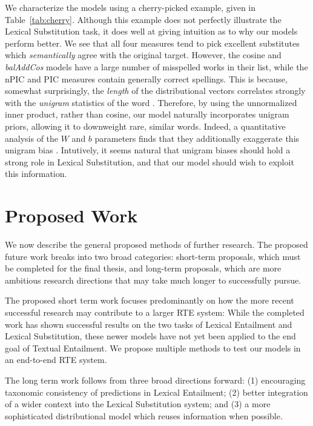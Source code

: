 \documentclass[12pt]{article}
\begin{document}
We characterize the models using a cherry-picked example,
given in Table~\ref{tab:cherry}. Although this example does not perfectly illustrate
the Lexical Substitution task, it does well at giving intuition as to why our
models perform better. We see that all four measures
tend to pick excellent substitutes which {\em semantically} agree with the
original target. However, the cosine and {\em balAddCos} models have a large number of
misspelled works in their list, while the nPIC and PIC measures contain
generally correct spellings. This is because, somewhat surprisingly, the {\em
length} of the distributional vectors correlates strongly with the {\em
unigram} statistics of the word \cite{wilson:2015:arxiv}.
Therefore, by using the unnormalized inner
product, rather than cosine, our model naturally incorporates unigram priors,
allowing it to downweight rare, similar words. Indeed, a quantitative analysis
of the $W$ and $b$ parameters finds that they additionally exaggerate this
unigram bias \cite{roller:2016:naacl}.
Intutively, it seems natural that unigram biases should hold a strong role in
Lexical Substitution, and that our model should wish to exploit this
information.

\section{Proposed Work}

We now describe the general proposed methods of further research. The proposed
future work breaks into two broad categories: short-term proposals,
which must be completed for the final thesis, and long-term proposals, which
are more ambitious research directions that may take much longer to successfully
pursue.

The proposed short term work focuses predominantly on how the more recent
successful research may contribute to a larger RTE system: While the completed
work has shown successful results on the two tasks of Lexical Entailment and
Lexical Substitution, these newer models have not yet been applied to the end
goal of Textual Entailment. We propose multiple methods to test our models
in an end-to-end RTE system.

The long term work follows from three broad directions forward: (1) encouraging
taxonomic consistency of predictions in Lexical Entailment; (2) better integration
of a wider context into the Lexical Substitution system; and (3) a more sophisticated
distributional model which reuses information when possible.
\end{document}
